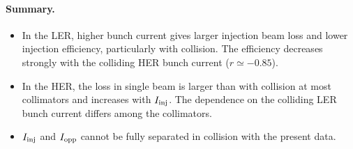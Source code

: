 \paragraph{Summary.}
\begin{itemize}
    \item In the LER, higher bunch current gives larger injection beam loss and lower injection efficiency, particularly with collision.
    The efficiency decreases strongly with the colliding HER bunch current ($r \simeq -0.85$).
    \item In the HER, the loss in single beam is larger than with collision at most collimators and increases with $I_{\mathrm{inj}}$.
    The dependence on the colliding LER bunch current differs among the collimators.
    \item $I_{\mathrm{inj}}$ and $I_{\mathrm{opp}}$ cannot be fully separated in collision with the present data.
\end{itemize}


